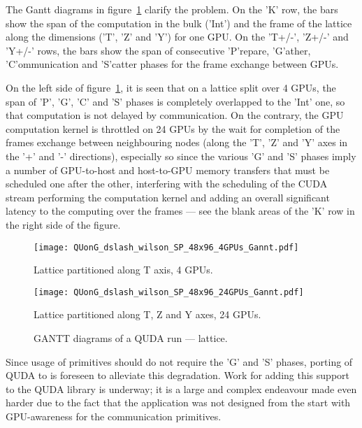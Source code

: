 The Gantt diagrams in figure~\ref{fig:qudagantt} clarify the problem.
On the 'K' row, the bars show the span of the computation in the bulk
('Int') and the frame of the lattice along the dimensions ('T', 'Z' and
'Y') for one GPU.
On the 'T+/-', 'Z+/-' and 'Y+/-' rows, the bars show the span of
consecutive 'P'repare, 'G'ather, 'C'ommunication and 'S'catter phases
for the frame exchange between GPUs.

On the left side of figure~\ref{fig:qudagantt}, it is seen that on a
 lattice split over 4 GPUs, the span of 'P', 'G', 'C'
and 'S' phases is completely overlapped to the 'Int' one, so that
computation is not delayed by communication.
On the contrary, the GPU computation kernel is throttled on 24 GPUs by
the wait for completion of the frames exchange between neighbouring
nodes (along the 'T', 'Z' and 'Y' axes in the '+' and '-' directions),
especially so since the various 'G' and 'S' phases imply a number of
GPU-to-host and host-to-GPU memory transfers that must be scheduled
one after the other, interfering with the scheduling of the CUDA
stream performing the computation kernel and adding an overall
significant latency to the computing over the frames --- see the blank
areas of the 'K' row in the right side of the figure.

\begin{figure}[ht]
  \begin{minipage}[b]{0.45\linewidth}
    \centering
    \texttt{[image: QUonG\_dslash\_wilson\_SP\_48x96\_4GPUs\_Gannt.pdf]}
    \caption*{Lattice partitioned along T axis, 4 GPUs.}
  \end{minipage}
  \hspace{0.5cm}
  \begin{minipage}[b]{0.45\linewidth}
    \centering
    \texttt{[image: QUonG\_dslash\_wilson\_SP\_48x96\_24GPUs\_Gannt.pdf]}
    \caption*{Lattice partitioned along T, Z and Y axes, 24 GPUs.}
  \end{minipage}
  \caption{GANTT diagrams of a QUDA run ---  lattice.}
  \label{fig:qudagantt}
\end{figure}

Since usage of \PtoP primitives should do not require the 'G' and 'S'
phases, porting of QUDA to \apenetp is foreseen to alleviate this
degradation.
Work for adding this support to the QUDA library is underway; it is a
large and complex endeavour made even harder due to the fact that the
application was not designed from the start with GPU-awareness for the
communication primitives.

